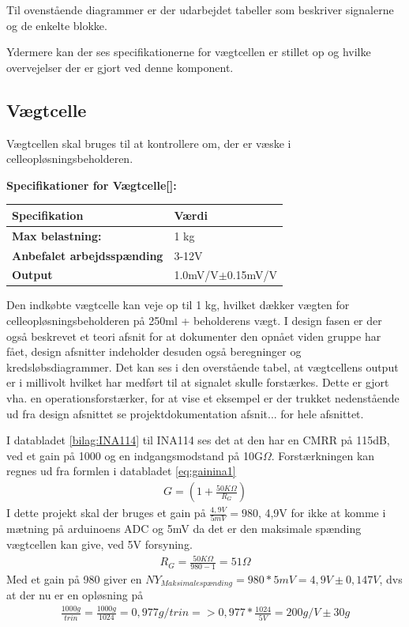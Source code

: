 Til ovenstående diagrammer er der udarbejdet tabeller som beskriver signalerne og de enkelte blokke. 

Ydermere kan der ses specifikationerne for vægtcellen er stillet op og hvilke overvejelser der er gjort ved denne komponent.
\subsection{Vægtcelle}
\label{subsec:loadcell}
Vægtcellen skal bruges til at kontrollere om, der er væske i celleopløsningsbeholderen.

\textbf{Specifikationer for Vægtcelle[\citet{DH7}]:} 
\begin{center}
		\begin{longtable}{ | m{6.5cm} | m{6.5cm}| } 
			\hline
			\textbf{Specifikation} &\textbf{Værdi} \\ 
			\hline
			\textbf{Max belastning:} & 1 kg \\ 
			\hline
			\textbf{Anbefalet arbejdsspænding} & 3-12V \\ 
			\hline
			\textbf{Output} & 1.0mV/V$\pm$0.15mV/V \\ 
			\hline
		\end{longtable}
\end{center}

Den indkøbte vægtcelle kan veje op til 1 kg, hvilket dækker vægten for celleopløsningsbeholderen på 250ml + beholderens vægt. I design fasen er der også beskrevet et teori afsnit for at dokumenter den opnået viden gruppe har fået, design afsnitter indeholder desuden også beregninger og kredsløbsdiagrammer. Det kan ses i den overstående tabel, at vægtcellens output er i millivolt hvilket har medført til at signalet skulle forstærkes. Dette er gjort vha. en operationsforstærker, for at vise et eksempel er der trukket nedenstående ud fra design afsnittet se projektdokumentation afsnit...  for hele afsnittet. 

I databladet \ref{bilag:INA114} til INA114 ses det at den har en CMRR på 115dB, ved et gain på 1000 og en indgangsmodstand på 10G$\Omega$. Forstærkningen kan regnes ud fra formlen i databladet \ref{eq:gainina1}
\begin{align}
 G=(1+\frac{50K\Omega}{R_{G}})
 \label{eq:gainina1}
 \end{align} 
 I dette projekt skal der bruges et gain på $\frac{4,9V}{5mV}=980$, 4,9V for ikke at komme i mætning på arduinoens ADC og 5mV da det er den maksimale spænding vægtcellen kan give, ved 5V forsyning.
 \begin{align}
 R_{G}=\frac{50K\Omega}{980-1}=51\Omega
 \label{eq:gainina2}
 \end{align}
Med et gain på 980 giver en $NY_{Maksimalespænding}=980*5mV=4,9V \pm0,147V$, dvs at der nu er en opløsning på
\begin{align}
 \frac{1000g}{trin}=\frac{1000g}{1024}=0,977g/trin=>0,977*\frac{1024}{5V}=200g/V \pm30g
 \label{eq:gainina3}
 \end{align}
 

